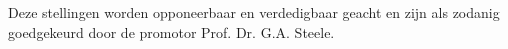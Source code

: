 \documentclass{dissertation-edit}
\begin{document}
{\begin{enumerate}
\end{enumerate}

\bigskip
\bigskip

\begin{center}
Deze stellingen worden opponeerbaar en verdedigbaar geacht en zijn als zodanig goedgekeurd door de promotor Prof. Dr. G.A. Steele.
\end{center}

}
\end{document}
